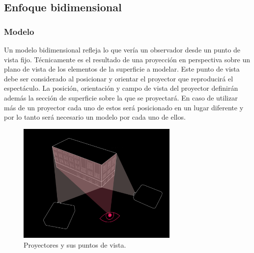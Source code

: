 \subsection{Enfoque bidimensional}
\subsubsection{Modelo}
Un modelo bidimensional refleja lo que vería un observador desde un punto de vista fijo.
Técnicamente es el resultado de una proyección en perspectiva \cite{LibroCompGrafica} sobre un plano de vista de los elementos de la superficie a modelar.
Este punto de vista debe ser considerado al posicionar y orientar el proyector que reproducirá el espectáculo.
La posición, orientación y campo de vista del proyector definirán además la sección de superficie sobre la que se proyectará.
En caso de utilizar más de un proyector cada uno de estos será posicionado en un lugar diferente y por lo tanto será necesario un modelo por cada uno de ellos.

\begin{figure}[H]
  \centering
    \includegraphics[width=0.7\textwidth]{./Cap2_videomapping/diagrama-2proyectores}
  \caption[vvvv.org]{Proyectores y sus puntos de vista.}
  \label{fig:diagrama-2proyectores}
\end{figure}

